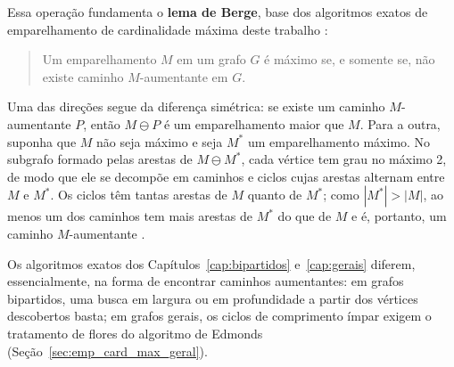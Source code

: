 \begin{figure}[H]
\end{figure}

Essa operação fundamenta o \textbf{lema de Berge}, base dos algoritmos exatos de emparelhamento de cardinalidade máxima deste trabalho \cite{jungnickel}:

\begin{quotation}
    Um emparelhamento $M$ em um grafo $G$ é máximo se, e somente se, não existe caminho $M$-aumentante em $G$.
\end{quotation}

Uma das direções segue da diferença simétrica: se existe um caminho $M$-aumentante $P$, então $M \ominus P$ é um emparelhamento maior que $M$. Para a outra, suponha que $M$ não seja máximo e seja $M^*$ um emparelhamento máximo. No subgrafo formado pelas arestas de $M \ominus M^*$, cada vértice tem grau no máximo 2, de modo que ele se decompõe em caminhos e ciclos cujas arestas alternam entre $M$ e $M^*$. Os ciclos têm tantas arestas de $M$ quanto de $M^*$; como $|M^*| > |M|$, ao menos um dos caminhos tem mais arestas de $M^*$ do que de $M$ e é, portanto, um caminho $M$-aumentante \cite{schrijver}.

Os algoritmos exatos dos Capítulos~\ref{cap:bipartidos} e~\ref{cap:gerais} diferem, essencialmente, na forma de encontrar caminhos aumentantes: em grafos bipartidos, uma busca em largura ou em profundidade a partir dos vértices descobertos basta; em grafos gerais, os ciclos de comprimento ímpar exigem o tratamento de flores do algoritmo de Edmonds (Seção~\ref{sec:emp_card_max_geral}).

